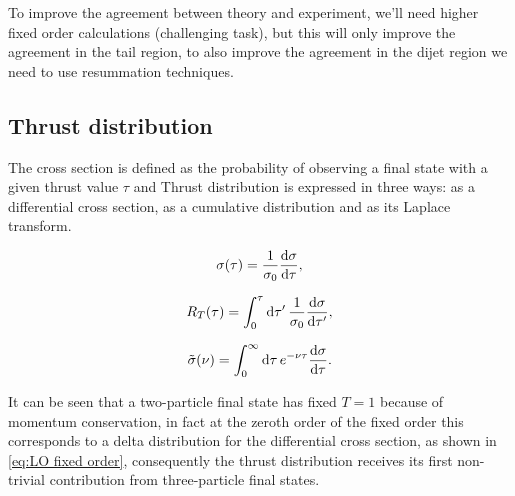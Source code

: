 \documentclass[../Tesi_Jiahao_Miao_986136.tex]{subfiles}
\begin{document}
To improve the agreement between theory and experiment, we'll need higher fixed order calculations (challenging task), but this will only 
improve the agreement in the tail region, to also improve the agreement in the dijet region we need to use resummation techniques.


\subsection{Thrust distribution} \label{subsec:Thrust_distribution}

The cross section is defined as the probability of observing a final state with a given thrust value $\tau$ and Thrust distribution is expressed in three ways:
as a differential cross section, as a cumulative distribution and as its Laplace transform.

\begin{equation}\label{eq:differential_cross_section}
    \sigma(\tau) =  \frac{1}{\sigma_0} \dv{\sigma}{\tau} ,
\end{equation}

\begin{equation}\label{eq:cumulative_distribution}
    R_T(\tau) = \int^\tau_0 \dd{\tau'} \frac{1}{\sigma_0}\dv{\sigma}{\tau'} ,
\end{equation}

\begin{equation}\label{eq:Laplace transform distribution}
    \Tilde{\sigma}(\nu) = \int^\infty_0 \dd{\tau} e^{-\nu \tau} \dv{\sigma}{\tau} .
\end{equation}

It can be seen that a two-particle final state has fixed $T = 1$ because of momentum conservation, in fact at the zeroth order of the fixed order this corresponds to a delta distribution 
for the differential cross section, as shown in  \cref{eq:LO fixed order}, consequently the thrust distribution receives its first non-trivial contribution 
from three-particle final states.
\end{document}
